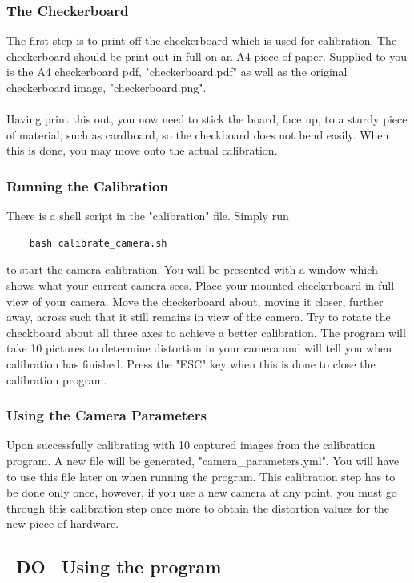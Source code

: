 \documentclass[11pt]{article}
\begin{document}
\subsubsection*{The Checkerboard}
The first step is to print off the checkerboard which is used for 
calibration. The checkerboard should be print out in full  on an
A4 piece of paper. Supplied to you is the A4 checkerboard pdf,
"checkerboard.pdf" as well as the original checkerboard image,
"checkerboard.png".\\
\\
Having print this out, you now need to stick the board, face up, to 
a sturdy piece of material, such as cardboard, so the checkboard
does not bend easily. When this is done, you may move onto the 
actual calibration.

\subsubsection*{Running the Calibration}
There is a shell script in the "calibration" file. Simply run

\begin{verbatim}
	bash calibrate_camera.sh
\end{verbatim}


to start the camera calibration. You will be presented with a 
window which shows what your current camera sees. Place your 
mounted checkerboard in full view of your camera. Move the 
checkerboard about, moving it closer, further away, across such
that it still remains in view of the camera. Try to rotate
the checkboard about all three axes to achieve a better calibration.
The program will take 10 pictures to determine distortion in your 
camera and will tell you when calibration has finished. 
Press the "ESC" key when this is done to close the calibration program.

\subsubsection*{Using the Camera Parameters}
Upon successfully calibrating with 10 captured images from the 
calibration program. A new file will be generated, "camera\_parameters.yml".
You will have to use this file later on when running the program.
This calibration step has to be done only once, however, if you
use a new camera at any point, you must go through this calibration 
step once more to obtain the distortion values for the new piece of
hardware.

\subsection{~DO~ Using the program}
\end{document}
